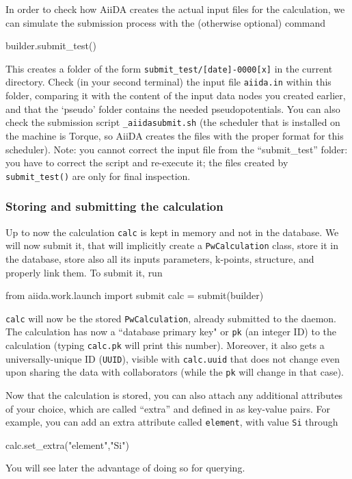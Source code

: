 In order to check how AiiDA creates the actual input files for the calculation, we can simulate the submission process with the (otherwise optional) command
\begin{pythoncommand}
 builder.submit_test()
\end{pythoncommand}
This creates a folder of the form \texttt{submit\_test/[date]-0000[x]} in the current directory. Check (in your second terminal) the input file \texttt{aiida.in} within this folder, comparing it with the content of the input data nodes you created earlier, and that the `pseudo' folder contains the needed pseudopotentials. You can also check the submission script \texttt{\_aiidasubmit.sh} (the scheduler that is installed on the machine is Torque, so AiiDA creates the files with the proper format for this scheduler).
Note: you cannot correct the input file from the ``submit\_test'' folder: you have to correct the script and re-execute it; the files created by \texttt{submit\_test()} are only for final inspection.









\subsubsection{Storing and submitting the calculation}
Up to now the calculation \texttt{calc} is kept in memory and not in the database. 
We will now submit it, that will implicitly create a \texttt{PwCalculation} class, 
store it in the database, store also all its inputs parameters, k-points, structure,
and properly link them.
To submit it, run
\begin{pythoncommand}
    from aiida.work.launch import submit
    calc = submit(builder)
\end{pythoncommand}
\texttt{calc} will now be the stored \texttt{PwCalculation}, already submitted 
to the daemon. The calculation has now a ``database primary key" or \texttt{pk} 
(an integer ID) to the calculation (typing \texttt{calc.pk} will print this number). 
Moreover, it also gets a universally-unique ID (\texttt{UUID}), 
visible with \texttt{calc.uuid} that does not change even upon sharing
the data with collaborators (while the \texttt{pk} will change in that case).

Now that the calculation is stored, you can also attach any additional attributes 
of your choice, which are called ``extra'' and defined in as key-value pairs.
For example, you can add an extra attribute called \texttt{element}, with value \texttt{Si} through
\begin{pythoncommand}
 calc.set_extra("element","Si")
\end{pythoncommand}
You will see later the advantage of doing so for querying.

